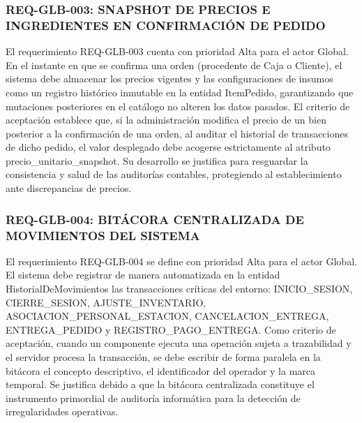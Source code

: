 \subsubsection{REQ-GLB-003: SNAPSHOT DE PRECIOS E INGREDIENTES EN CONFIRMACIÓN DE PEDIDO}
El requerimiento REQ-GLB-003 cuenta con prioridad Alta para el actor Global. En el instante en que se confirma una orden (procedente de Caja o Cliente), el sistema debe almacenar los precios vigentes y las configuraciones de insumos como un registro histórico inmutable en la entidad ItemPedido, garantizando que mutaciones posteriores en el catálogo no alteren los datos pasados. El criterio de aceptación establece que, si la administración modifica el precio de un bien posterior a la confirmación de una orden, al auditar el historial de transacciones de dicho pedido, el valor desplegado debe acogerse estrictamente al atributo precio\_unitario\_snapshot. Su desarrollo se justifica para resguardar la consistencia y salud de las auditorías contables, protegiendo al establecimiento ante discrepancias de precios.

\subsubsection{REQ-GLB-004: BITÁCORA CENTRALIZADA DE MOVIMIENTOS DEL SISTEMA}
El requerimiento REQ-GLB-004 se define con prioridad Alta para el actor Global. El sistema debe registrar de manera automatizada en la entidad HistorialDeMovimientos las transacciones críticas del entorno: INICIO\_SESION, CIERRE\_SESION, AJUSTE\_INVENTARIO, ASOCIACION\_PERSONAL\_ESTACION, CANCELACION\_ENTREGA, ENTREGA\_PEDIDO y REGISTRO\_PAGO\_ENTREGA. Como criterio de aceptación, cuando un componente ejecuta una operación sujeta a trazabilidad y el servidor procesa la transacción, se debe escribir de forma paralela en la bitácora el concepto descriptivo, el identificador del operador y la marca temporal. Se justifica debido a que la bitácora centralizada constituye el instrumento primordial de auditoría informática para la detección de irregularidades operativas.

